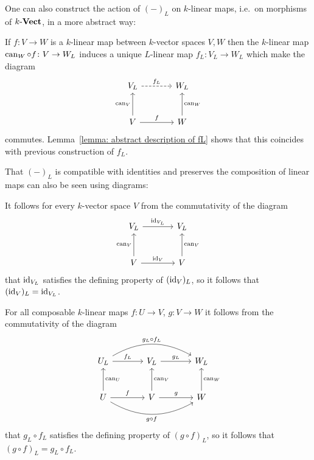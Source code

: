 \begin{remark}
  One can also construct the action of $(-)_L$ on $k$-linear maps, i.e.\ on morphisms of $k\text{-}\mathbf{Vect}$, in a more abstract way:
  
  If $f \colon V \to W$ is a $k$-linear map between $k$-vector spaces $V, W$ then the $k$-linear map $\operatorname{can}_W \circ f \colon V \to W_L$ induces a unique $L$-linear map $f_L \colon V_L \to W_L$ which make the diagram
  \[
    \begin{tikzcd}[sep = large]
        V_L
        \arrow[dashed]{r}[above]{f_L}
      & W_L
      \\
        V
        \arrow{r}[above]{f}
        \arrow{u}[left]{\can_V}
      & W
        \arrow{u}[right]{\can_W}
    \end{tikzcd}
  \]
  commutes.
  Lemma~\ref{lemma: abstract description of fL} shows that this coincides with previous construction of $f_L$.
  
  That $(-)_L$ is compatible with identities and preserves the composition of linear maps can also be seen using diagrams:
  
  It follows for every $k$-vector space $V$ from the commutativity of the diagram
  \[
    \begin{tikzcd}[sep = large]
        V_L
        \arrow{r}[above]{\id_{V_L}}
      & V_L
      \\
        V
        \arrow{r}[above]{\id_V}
        \arrow{u}[left]{\can_V}
      & V
        \arrow{u}[right]{\can_V}
    \end{tikzcd}
  \]
  that $\operatorname{id}_{V_L}$ satisfies the defining property of $(\operatorname{id}_V)_L$, so it follows that $(\operatorname{id}_V)_L = \operatorname{id}_{V_L}$.
  
  For all composable $k$-linear maps $f \colon U \to V$, $g \colon V \to W$ it follows from the commutativity of the diagram
  \[
    \begin{tikzcd}[sep = large]
        U_L
        \arrow{r}[above]{f_L}
        \arrow[bend left]{rr}[above]{g_L \circ f_L}
      & V_L
        \arrow{r}[above]{g_L}
      & W_L
      \\
        U
        \arrow{u}[right]{\can_U}
        \arrow{r}[above]{f}
        \arrow[bend right]{rr}[below]{g \circ f}
      & V
        \arrow{u}[right]{\can_V}
        \arrow{r}[above]{g}
      & W
        \arrow{u}[right]{\can_W}
    \end{tikzcd}
  \]
  that $g_L \circ f_L$ satisfies the defining property of $(g \circ f)_L$, so it follows that $(g \circ f)_L= g_L \circ f_L$.
\end{remark}


